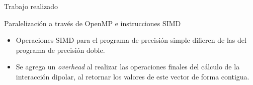\begin{frame}{Trabajo realizado}
\begin{block}{Paralelización a través de OpenMP e instrucciones SIMD}
\begin{itemize}
  \item Operaciones SIMD para el programa de precisión simple difieren de las del programa de precisión doble.
  \item Se agrega un \textit{overhead} al realizar las operaciones finales del cálculo de la interacción dipolar, al retornar los valores de este vector de forma contigua.
\end{itemize}
\end{block}
\end{frame}